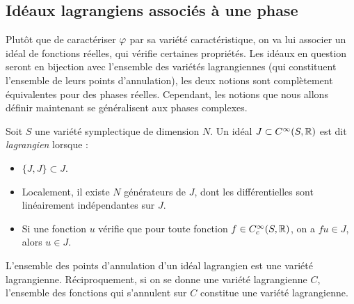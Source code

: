 \subsection{Idéaux lagrangiens associés à une phase}
Plutôt que de caractériser $\varphi$ par sa variété caractéristique, on va lui associer un idéal de fonctions réelles, qui vérifie certaines propriétés. Les idéaux en question seront en bijection avec l'ensemble des variétés lagrangiennes (qui constituent l'ensemble de leurs points d'annulation), les deux notions sont complètement équivalentes pour des phases réelles. Cependant, les notions que nous allons définir maintenant se généralisent aux phases complexes.

\begin{defn}Soit $S$ une variété symplectique de dimension $N$. Un idéal $J \subset C^{\infty}(S,\mathbb{R})$ est dit \emph{lagrangien} lorsque :
\begin{itemize}
  \item $\{J,J\}\subset J$.
  \item Localement, il existe $N$ générateurs de $J$, dont les différentielles sont linéairement indépendantes sur $J$.
  \item Si une fonction $u$ vérifie que pour toute fonction $f \in C^{\infty}_c(S,\mathbb{R})$, on a $fu \in J$, alors $u \in J$.
\end{itemize}
\end{defn}
\begin{rem}
	L'ensemble des points d'annulation d'un idéal lagrangien est une variété lagrangienne. Réciproquement, si on se donne une variété lagrangienne $C$, l'ensemble des fonctions qui s'annulent sur $C$ constitue une variété lagrangienne.
\end{rem}

